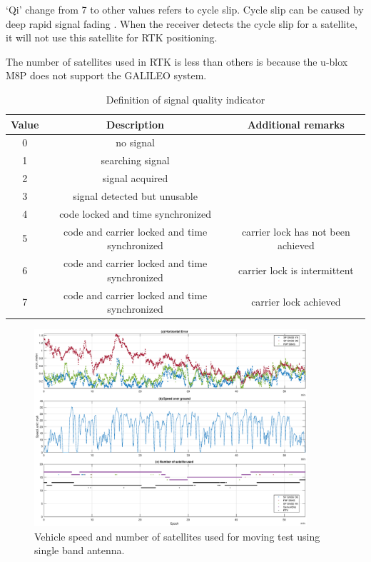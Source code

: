 \documentclass[letterpaper, 10 pt,onecolumn]{article}
\begin{document}
	`Qi' change from 7 to other values refers to cycle slip. Cycle slip can be caused by deep rapid signal fading \cite{sennott1992use}. When the receiver detects the cycle slip for a satellite, it will not use this satellite for RTK positioning.
	
	The number of satellites used in RTK is less than others is because the u-blox M8P does not support the GALILEO system.
	
	\begin{table}[H]
		\centering
		\begin{tabular}{|c|c|c|}
			\hline
			Value & Description                                   & Additional remarks                 \\ \hline
			0     & no signal                                     &                                    \\ \hline
			1     & searching signal                              &                                    \\ \hline
			2     & signal acquired                               &                                    \\ \hline
			3     & signal detected but unusable                  &                                    \\ \hline
			4     & code locked and time synchronized             &                                    \\ \hline
			5     & code and carrier locked and time synchronized & carrier lock has not been achieved \\ \hline
			6     & code and carrier locked and time synchronized & carrier lock is intermittent       \\ \hline
			7     & code and carrier locked and time synchronized & carrier lock achieved              \\ \hline
		\end{tabular}
		\label{tab:qi}
		\caption{Definition of signal quality indicator}
	\end{table}
	
	\begin{figure}[H]
		\centering
		\includegraphics[width=0.9\textwidth]{figures/dynamicinfo_single.eps}
		\caption{Vehicle speed and number of satellites used for moving test using single band antenna.}
		\label{fig:m1vspeed}
	\end{figure}
\end{document}
